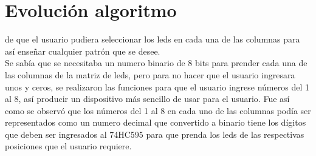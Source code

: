 \documentclass{article}
\begin{document}
\section{Evolución algoritmo} \label{evolucion}
de que el usuario pudiera seleccionar los leds en cada una de las columnas para así enseñar cualquier patrón que se desee.\\
Se sabía que se necesitaba un numero binario de 8 bits para prender cada una de las columnas de la matriz de leds, pero para no hacer que el usuario ingresara unos y ceros, se realizaron las funciones para que el usuario ingrese números del 1 al 8, así producir un dispositivo más sencillo de usar para el usuario. Fue así como se observó que los números del 1 al 8 en cada uno de las columnas podía ser representados como un numero decimal que convertido a binario tiene los dígitos que deben ser ingresados al 74HC595 para que prenda los leds de las respectivas posiciones que el usuario requiere. 
\end{document}
